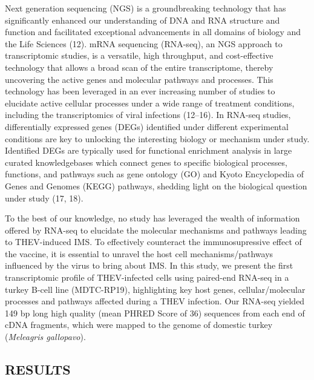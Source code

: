 \documentclass[
]{article}
\begin{document}
Next generation sequencing (NGS) is a groundbreaking technology that has
significantly enhanced our understanding of DNA and RNA structure and
function and facilitated exceptional advancements in all domains of
biology and the Life Sciences (12). mRNA sequencing (RNA-seq), an NGS
approach to transcriptomic studies, is a versatile, high throughput, and
cost-effective technology that allows a broad scan of the entire
transcriptome, thereby uncovering the active genes and molecular
pathways and processes. This technology has been leveraged in an ever
increasing number of studies to elucidate active cellular processes
under a wide range of treatment conditions, including the
transcriptomics of viral infections (12--16). In RNA-seq studies,
differentially expressed genes (DEGs) identified under different
experimental conditions are key to unlocking the interesting biology or
mechanism under study. Identified DEGs are typically used for functional
enrichment analysis in large curated knowledgebases which connect genes
to specific biological processes, functions, and pathways such as gene
ontology (GO) and Kyoto Encyclopedia of Genes and Genomes (KEGG)
pathways, shedding light on the biological question under study (17,
18).

To the best of our knowledge, no study has leveraged the wealth of
information offered by RNA-seq to elucidate the molecular mechanisms and
pathways leading to THEV-induced IMS. To effectively counteract the
immunosupressive effect of the vaccine, it is essential to unravel the
host cell mechanisms/pathways influenced by the virus to bring about
IMS. In this study, we present the first transcriptomic profile of
THEV-infected cells using paired-end RNA-seq in a turkey B-cell line
(MDTC-RP19), highlighting key host genes, cellular/molecular processes
and pathways affected during a THEV infection. Our RNA-seq yielded 149
bp long high quality (mean PHRED Score of 36) sequences from each end of
cDNA fragments, which were mapped to the genome of domestic turkey
(\emph{Meleagris gallopavo}). \newpage

\subsection{RESULTS}\label{results}
\end{document}

